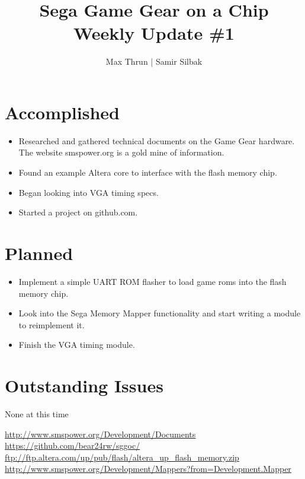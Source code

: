\documentclass[12pt]{article}
\title{Sega Game Gear on a Chip \\ Weekly Update \#1}
\author{ Max Thrun | Samir Silbak }
\begin{document}
\maketitle

\section*{Accomplished}
\begin{itemize}
    \item Researched and gathered technical documents on the Game Gear hardware. The website 
        smspower.org\cite{smspower} is a gold mine of information.
    \item Found an example Altera core to interface with the flash memory chip\cite{altera}.
    \item Began looking into VGA timing specs.
    \item Started a project on github.com\cite{github}.
\end{itemize}

\section*{Planned}
\begin{itemize}
    \item Implement a simple UART ROM flasher to load game roms into the flash memory chip.
    \item Look into the Sega Memory Mapper\cite{mapper} functionality and start writing a module to reimplement it.
    \item Finish the VGA timing  module.
\end{itemize}

\section*{Outstanding Issues}
None at this time

\begin{thebibliography}{9}
     \url{http://www.smspower.org/Development/Documents}
     \url{https://github.com/bear24rw/sggoc/}
     \url{ftp://ftp.altera.com/up/pub/flash/altera_up_flash_memory.zip}
     \url{http://www.smspower.org/Development/Mappers?from=Development.Mapper}
\end{thebibliography}
\end{document}
